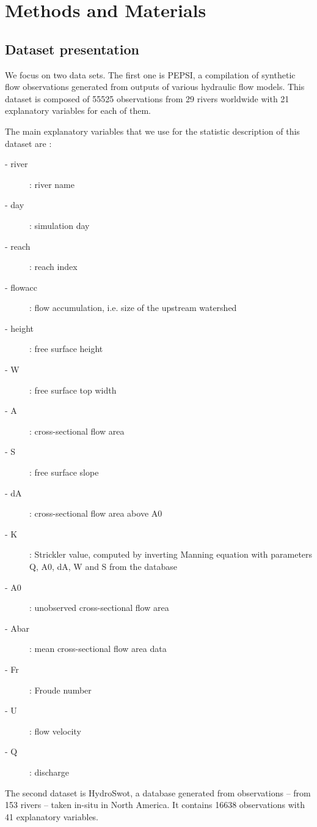 \section{Methods and Materials}

\subsection{Dataset presentation} 

We focus on two data sets. The first one is PEPSI, a compilation of synthetic flow observations generated from outputs of various hydraulic flow models. This dataset is composed of 55525 observations from 29 rivers worldwide with 21 explanatory variables for each of them.

\noindent The main explanatory variables that we use for the statistic description of this dataset are : 
\begin{description}
    \item [- river]: river name
    \item [- day]: simulation day 
    \item [- reach]: reach index
    \item [- flowacc] : flow accumulation, i.e. size of the upstream watershed
    \item [- height]: free surface height
    \item [- W]: free surface top width
    \item [- A]: cross-sectional flow area
    \item [- S]: free surface slope 
    \item [- dA]: cross-sectional flow area above A0
    \item [- K]: Strickler value, computed by inverting Manning equation with parameters Q, A0, dA, W and S from the database
    \item [- A0]: unobserved cross-sectional flow area 
    \item [- Abar]: mean cross-sectional flow area  data
    \item [- Fr]: Froude number 
    \item [- U]: flow velocity 
    \item [- Q]: discharge 
\end{description}

The second dataset is HydroSwot, a database generated from observations -- from 153 rivers -- taken in-situ in North America. It contains 16638 observations with 41 explanatory variables.

